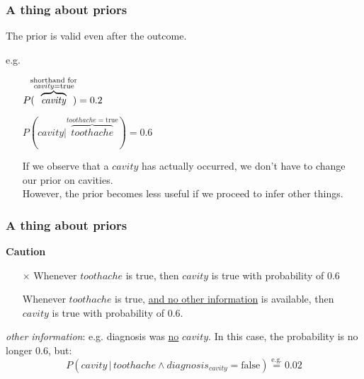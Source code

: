 \begin{frame}\frametitle{A thing about priors}

The prior is valid even after the outcome.

e.g.\\
\begin{itemize}
 \item[] $P( \kern-1ex \overbrace{\mathit{cavity}}^{\substack{\text{shorthand for}\\{\mathit{cavity}}=\text{true}}} \kern-1ex) = 0.2$
 \item[] $P(\mathit{cavity} | \overbrace{\mathit{toothache}}^{{\mathit{toothache}}=\text{true}}) = 0.6$
 \item[] If we observe that a $\mathit{cavity}$ has actually occurred, we don't have to change our prior on cavities.\\
 However, the prior becomes less useful if we proceed to infer other things.
\end{itemize}


\end{frame}

\begin{frame}\frametitle{A thing about priors}

    
\textbf{Caution}\\
\begin{itemize}
\item[$\times$] Whenever $\mathit{toothache}$ is true, then $\mathit{cavity}$ is true with probability of 0.6
\item[\checkmark] Whenever $\mathit{toothache}$ is true, \underline{and no other information} is available, then $\mathit{cavity}$ is true with probability of 0.6.
\end{itemize}

\textit{other information}: e.g. diagnosis was \underline{no} $\mathit{cavity}$. In this case, the probability is no longer 0.6, but:
\begin{equation}
P(\mathit{cavity} \,|\, \mathit{toothache} \wedge diagnosis_{\mathit{cavity}} = \text{false}) \stackrel{\text{e.g.}}{=} 0.02
\end{equation}

\end{frame}

